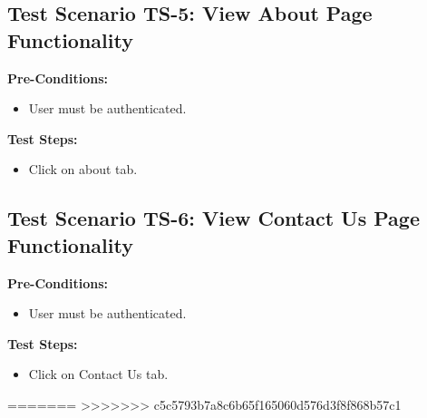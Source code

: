 \subsection{Test Scenario TS-5: View About Page Functionality}

\textbf{Pre-Conditions: }
\begin{itemize}

\item User must be authenticated.

\end{itemize}



\textbf{Test Steps:}
\begin{itemize}

\item Click on about tab.

\end{itemize}


\subsection{Test Scenario TS-6: View Contact Us Page Functionality}

\textbf{Pre-Conditions: }
\begin{itemize}

\item User must be authenticated.

\end{itemize}



\textbf{Test Steps:}
\begin{itemize}

\item Click on Contact Us tab.

\end{itemize}


















=======
>>>>>>> c5c5793b7a8c6b65f165060d576d3f8f868b57c1
